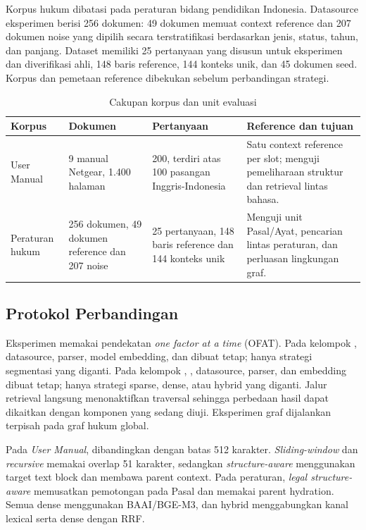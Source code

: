 Korpus hukum dibatasi pada peraturan bidang pendidikan Indonesia. Datasource eksperimen berisi 256 dokumen: 49 dokumen memuat context reference dan 207 dokumen noise yang dipilih secara terstratifikasi berdasarkan jenis, status, tahun, dan panjang. Dataset memiliki 25 pertanyaan yang disusun untuk eksperimen dan diverifikasi ahli, 148 baris reference, 144 konteks unik, dan 45 dokumen seed. Korpus dan pemetaan reference dibekukan sebelum perbandingan strategi.

\begin{table}[t]
\centering
\caption{Cakupan korpus dan unit evaluasi}
\label{tab:korpus-paper}
\begin{tabularx}{0.96\textwidth}{@{}p{}p{}p{}X@{}}
\toprule
\textbf{Korpus} & \textbf{Dokumen} & \textbf{Pertanyaan} & \textbf{Reference dan tujuan}\\
\midrule
User Manual & 9 manual Netgear, 1.400 halaman & 200, terdiri atas 100 pasangan Inggris-Indonesia & Satu context reference per slot; menguji pemeliharaan struktur dan retrieval lintas bahasa.\\
Peraturan hukum & 256 dokumen, 49 dokumen reference dan 207 noise & 25 pertanyaan, 148 baris reference dan 144 konteks unik & Menguji unit Pasal/Ayat, pencarian lintas peraturan, dan perluasan lingkungan graf.\\
\bottomrule
\end{tabularx}
\end{table}

\subsection{Protokol Perbandingan}

Eksperimen memakai pendekatan \textit{one factor at a time} (OFAT). Pada kelompok \chunker{}, datasource, parser, model embedding, dan \indexer{} dibuat tetap; hanya strategi segmentasi yang diganti. Pada kelompok \indexer{}, \chunker{}, datasource, parser, dan embedding dibuat tetap; hanya strategi sparse, dense, atau hybrid yang diganti. Jalur retrieval langsung menonaktifkan traversal \kg{} sehingga perbedaan hasil dapat dikaitkan dengan komponen yang sedang diuji. Eksperimen graf dijalankan terpisah pada graf hukum global.

Pada \textit{User Manual}, \chunker{} dibandingkan dengan batas 512 karakter. \textit{Sliding-window} dan \textit{recursive} memakai overlap 51 karakter, sedangkan \textit{structure-aware} menggunakan target text block dan membawa parent context. Pada peraturan, \textit{legal structure-aware} memusatkan pemotongan pada Pasal dan memakai parent hydration. Semua \indexer{} dense menggunakan BAAI/BGE-M3, dan hybrid menggabungkan kanal lexical serta dense dengan RRF.

